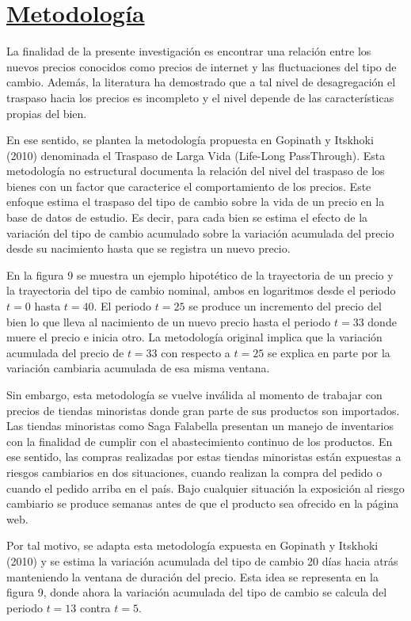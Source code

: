 \documentclass[12pt,a4paper,pdflatex]{article}
\begin{document}
\clearpage
\section{\underline{Metodología}}\label{sec3}
La finalidad de la presente investigación es encontrar una relación entre los nuevos precios conocidos como precios de internet y las fluctuaciones del tipo de cambio. Además, la literatura ha demostrado que a tal nivel de desagregación el traspaso hacia los precios es incompleto y el nivel depende de las características propias del bien.

En ese sentido, se plantea la metodología propuesta en Gopinath y Itskhoki (2010) denominada el Traspaso de Larga Vida (Life-Long PassThrough). Esta metodología no estructural documenta la relación del nivel del traspaso de los bienes con un factor que caracterice el comportamiento de los precios. Este enfoque estima el traspaso del tipo de cambio sobre la vida de un precio en la base de datos de estudio. Es decir, para cada bien se estima el efecto de la variación del tipo de cambio acumulado sobre la variación acumulada del precio desde su nacimiento hasta que se registra un nuevo precio.

En la figura 9 se muestra un ejemplo hipotético de la trayectoria de un precio y la trayectoria del tipo de cambio nominal, ambos en logaritmos desde el periodo $t = 0$ hasta $t = 40$. El periodo $t=25$ se produce un incremento del precio del bien lo que lleva al nacimiento de un nuevo precio hasta el periodo $t=33$ donde muere el precio e inicia otro. La metodología original implica que la variación acumulada del precio de $t=33$ con respecto a $t=25$ se explica en parte por la variación cambiaria acumulada de esa misma ventana.

Sin embargo, esta metodología se vuelve inválida al momento de trabajar con precios de tiendas minoristas donde gran parte de sus productos son importados. Las tiendas minoristas como Saga Falabella presentan un manejo de inventarios con la finalidad de cumplir con el abastecimiento continuo de los productos. En ese sentido, las compras realizadas por estas tiendas minoristas están expuestas a riesgos cambiarios en dos situaciones, cuando realizan la compra del pedido o cuando el pedido arriba en el país.
Bajo cualquier situación la exposición al riesgo cambiario se produce semanas antes de que el producto sea ofrecido en la página web.

Por tal motivo, se adapta esta metodología expuesta en Gopinath y Itskhoki (2010) y se estima la variación acumulada del tipo de cambio 20 días hacia atrás manteniendo la ventana de duración del precio. Esta idea se representa en la figura 9, donde ahora la variación acumulada del tipo de cambio se calcula del periodo $t = 13$ contra $t =5$.
\end{document}
